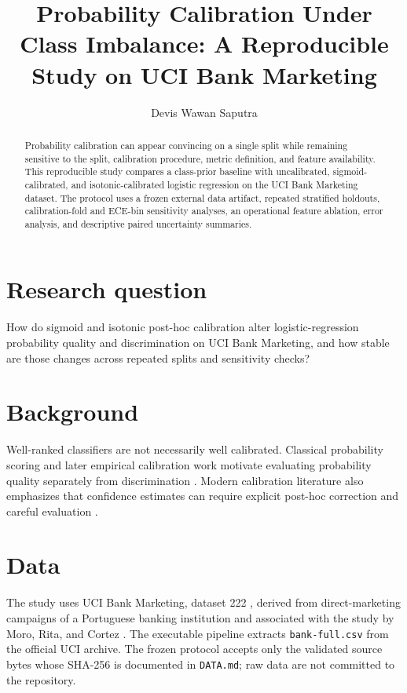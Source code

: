 \documentclass[11pt]{article}
\title{Probability Calibration Under Class Imbalance: A Reproducible Study on UCI Bank Marketing}
\author{Devis Wawan Saputra}
\date{}
\begin{document}
\maketitle

\begin{abstract}
Probability calibration can appear convincing on a single split while remaining sensitive to the split, calibration procedure, metric definition, and feature availability. This reproducible study compares a class-prior baseline with uncalibrated, sigmoid-calibrated, and isotonic-calibrated logistic regression on the UCI Bank Marketing dataset. The protocol uses a frozen external data artifact, repeated stratified holdouts, calibration-fold and ECE-bin sensitivity analyses, an operational feature ablation, error analysis, and descriptive paired uncertainty summaries.
\end{abstract}

\section{Research question}
How do sigmoid and isotonic post-hoc calibration alter logistic-regression probability quality and discrimination on UCI Bank Marketing, and how stable are those changes across repeated splits and sensitivity checks?

\section{Background}
Well-ranked classifiers are not necessarily well calibrated. Classical probability scoring and later empirical calibration work motivate evaluating probability quality separately from discrimination \cite{brier1950,niculescu2005}. Modern calibration literature also emphasizes that confidence estimates can require explicit post-hoc correction and careful evaluation \cite{guo2017}.

\section{Data}
The study uses UCI Bank Marketing, dataset 222 \cite{uciBankMarketing}, derived from direct-marketing campaigns of a Portuguese banking institution and associated with the study by Moro, Rita, and Cortez \cite{moro2014telemarketing}. The executable pipeline extracts \texttt{bank-full.csv} from the official UCI archive. The frozen protocol accepts only the validated source bytes whose SHA-256 is documented in \texttt{DATA.md}; raw data are not committed to the repository.
\end{document}
